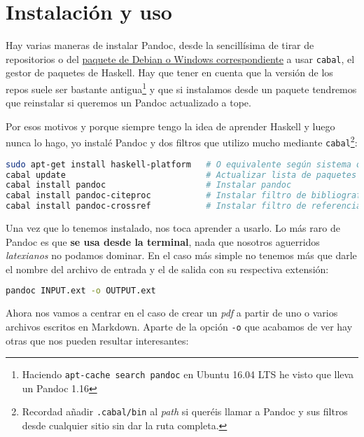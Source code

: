 \section{Instalación y uso}

Hay varias maneras de instalar Pandoc, desde la sencillísima de tirar de
repositorios o del
\href{https://github.com/jgm/pandoc/releases/tag/1.19.2.1}{paquete de
Debian o Windows correspondiente} a usar \lstinline!cabal!, el gestor de
paquetes de Haskell. Hay que tener en cuenta que la versión de los repos
suele ser bastante antigua\footnote{Haciendo
  \lstinline!apt-cache search pandoc! en Ubuntu 16.04 LTS he visto que
  lleva un Pandoc 1.16} y que si instalamos desde un paquete tendremos
que reinstalar si queremos un Pandoc actualizado a tope.

Por esos motivos y porque siempre tengo la idea de aprender Haskell y
luego nunca lo hago, yo instalé Pandoc y dos filtros que utilizo mucho
mediante \lstinline!cabal!\footnote{Recordad añadir
  \lstinline!.cabal/bin! al \emph{path} si queréis llamar a Pandoc y sus
  filtros desde cualquier sitio sin dar la ruta completa.}:

\begin{lstlisting}[language=bash]
sudo apt-get install haskell-platform   # O equivalente según sistema operativo
cabal update                            # Actualizar lista de paquetes
cabal install pandoc                    # Instalar pandoc
cabal install pandoc-citeproc           # Instalar filtro de bibliografía
cabal install pandoc-crossref           # Instalar filtro de referencias cruzadas
\end{lstlisting}

Una vez que lo tenemos instalado, nos toca aprender a usarlo. Lo más
raro de Pandoc es que \textbf{se usa desde la terminal}, nada que
nosotros aguerridos \emph{latexianos} no podamos dominar. En el caso más
simple no tenemos más que darle el nombre del archivo de entrada y el de
salida con su respectiva extensión:

\begin{lstlisting}[language=bash]
pandoc INPUT.ext -o OUTPUT.ext
\end{lstlisting}

Ahora nos vamos a centrar en el caso de crear un \emph{pdf} a partir de
uno o varios archivos escritos en Markdown. Aparte de la opción
\lstinline!-o! que acabamos de ver hay otras que nos pueden resultar
interesantes:

